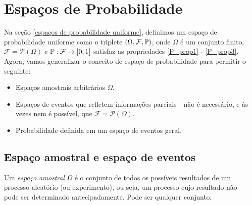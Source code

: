 


\clearpage
\section{Espaços de Probabilidade}

Na seção \ref{espaços de probabilidade uniforme}, definimos um espaço de probabilidade uniforme como o triplete $(\Omega,\mathcal{F},\mathbb{P})$, onde $\Omega$ é um conjunto finito, $\mathcal{F}=\mathcal{P}(\Omega)$ e $\mathbb{P}:\mathcal{F}\to[0,1]$ satisfaz as propriedades \eqref{P_prop1} - \eqref{P_prop3}. Agora, vamos generalizar o conceito de espaço de probabilidade para permitir o seguinte:
\begin{itemize}
    \item Espaços amostrais arbitrários $\Omega$.
    \item Espaços de eventos que refletem informações parciais - não é necessário, e às vezes nem é possível, que $\mathcal{F} = \mathcal{P}(\Omega)$.
    \item Probabilidade definida em um espaço de eventos geral.
\end{itemize}

\subsection{Espaço amostral e espaço de eventos}

\begin{definition}
    Um {\it espaço amostral} $\Omega$ é o conjunto de todos os possíveis resultados de um processo aleatório (ou experimento), ou seja, um processo cujo resultado não pode ser determinado antecipadamente. Pode ser qualquer conjunto.
\end{definition}

